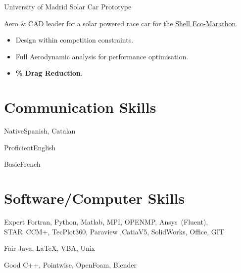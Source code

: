 \documentclass[fontsize=10pt]{tccv}
\begin{document}
\begin{eventlist}
     {University of Madrid}
     {Solar Car Prototype}

Aero \& CAD leader for a solar powered race car for the \href{http://www.shell.com/global/environment-society/ecomarathon.html}{Shell Eco-Marathon}.
\begin{itemize}
\itemsep -1pt
	\item Design within competition constraints.
        \item Full Aerodynamic analysis for performance optimisation.
	\item \textbf{\% Drag Reduction}.
\end{itemize}
\end{eventlist}

\section{Communication Skills}
\begin{factlist}
\item{Native}{Spanish, Catalan}
\item{Proficient}{English}
\item{Basic}{French}
\end{factlist}

\vspace{-20pt}
\section{Software/Computer Skills}
\begin{factlist}
\item{Expert}
     {Fortran, Python, Matlab, MPI, OPENMP, Ansys~(Fluent), STAR~CCM+, TecPlot360,
     Paraview ,CatiaV5, SolidWorks, Office, GIT}
\item{Fair}
     {Java, \LaTeX, VBA,  Unix}
\item{Good}
     {C++, Pointwise, OpenFoam, Blender}
\end{factlist}


\vspace{-20pt}
\end{document}
